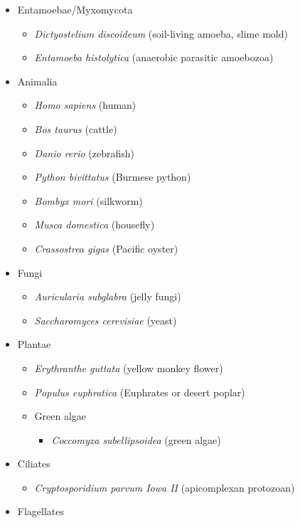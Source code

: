 \documentclass[10pt,letterpaper]{article}
\begin{document}
\begin{itemize}
	\item Entamoebae/Myxomycota
	\begin{itemize}
		\item \textit{Dictyostelium discoideum} (soil-living amoeba, slime mold)
		\item \textit{Entamoeba histolytica} (anaerobic parasitic amoebozoa)
	\end{itemize}
	\item Animalia
	\begin{itemize}
		\item \textit{Homo sapiens} (human)
		\item \textit{Bos taurus} (cattle)
		\item \textit{Danio rerio} (zebrafish)
		\item \textit{Python bivittatus} (Burmese python)
		\item \textit{Bombyx mori} (silkworm)
		\item \textit{Musca domestica} (housefly)
		\item \textit{Crassostrea gigas} (Pacific oyster)
	\end{itemize}
	\item Fungi
	\begin{itemize}
		\item \textit{Auricularia subglabra} (jelly fungi)
		\item \textit{Saccharomyces cerevisiae} (yeast)
	\end{itemize}
	\item Plantae
	\begin{itemize}
		\item \textit{Erythranthe guttata} (yellow monkey flower)
		\item \textit{Populus euphratica} (Euphrates or desert poplar)
		\item Green algae
		\begin{itemize}
			\item \textit{Coccomyxa subellipsoidea} (green algae)
		\end{itemize}
	\end{itemize}
	\item Ciliates
	\begin{itemize}
		\item \textit{Cryptosporidium parvum Iowa II} (apicomplexan protozoan)
	\end{itemize}
	\item Flagellates
	\begin{itemize}

\end{itemize}
\end{itemize}
\end{document}
